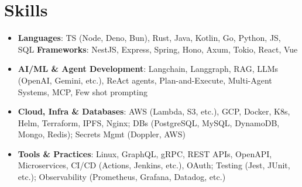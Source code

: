 \documentclass[letterpaper,11pt]{article}
\newcommand{\resumeSubHeadingListStart}{\begin{itemize}[leftmargin=*]}
\newcommand{\resumeSubHeadingListEnd}{\end{itemize}}
\begin{document}
\section{Skills}
  \resumeSubHeadingListStart
    \item{ \textbf{Languages}{: TS (Node, Deno, Bun), Rust, Java, Kotlin, Go, Python, JS, SQL} \hfill \textbf{Frameworks}{: NestJS, Express, Spring, Hono, Axum, Tokio, React, Vue} }
    \item{ \textbf{AI/ML \& Agent Development}{: Langchain, Langgraph, RAG, LLMs (OpenAI, Gemini, etc.), ReAct agents, Plan-and-Execute, Multi-Agent Systems, MCP, Few shot prompting} }
    \item{ \textbf{Cloud, Infra \& Databases}{: AWS (Lambda, S3, etc.), GCP, Docker, K8s, Helm, Terraform, IPFS, Nginx; DBs (PostgreSQL, MySQL, DynamoDB, Mongo, Redis); Secrets Mgmt (Doppler, AWS)} }
    \item{ \textbf{Tools \& Practices}{: Linux, GraphQL, gRPC, REST APIs, OpenAPI, Microservices, CI/CD (Actions, Jenkins, etc.), OAuth; Testing (Jest, JUnit, etc.); Observability (Prometheus, Grafana, Datadog, etc.)} }
  \resumeSubHeadingListEnd


\end{document}
